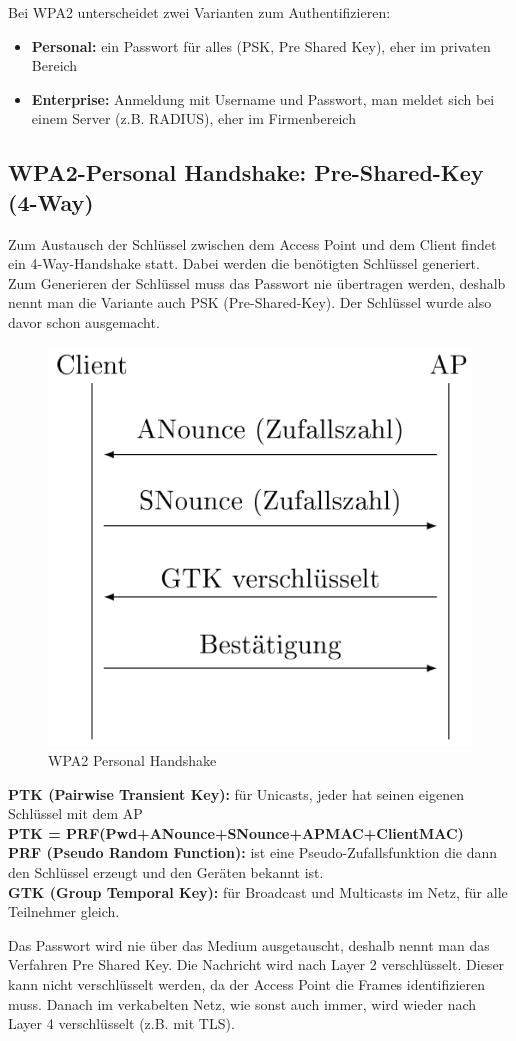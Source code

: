 Bei WPA2 unterscheidet zwei Varianten zum Authentifizieren:
\begin{itemize}
	\item \textbf{Personal:} ein Passwort für alles (PSK, Pre Shared Key), eher im privaten Bereich
	\item \textbf{Enterprise:} Anmeldung mit Username und Passwort, man meldet sich bei einem Server (z.B. RADIUS), eher im Firmenbereich
\end{itemize}

\subsection*{WPA2-Personal Handshake: Pre-Shared-Key (4-Way)}
Zum Austausch der Schlüssel zwischen dem Access Point und dem Client findet ein 4-Way-Handshake statt. Dabei werden die benötigten Schlüssel generiert. Zum Generieren der Schlüssel muss das Passwort nie übertragen werden, deshalb nennt man die Variante auch PSK (Pre-Shared-Key). Der Schlüssel wurde also davor schon ausgemacht.

\begin{figure}[H]
	\centering
	\includegraphics[width=0.8\linewidth]{figures/wpa2_personal_handshake.png}
	\caption{WPA2 Personal Handshake}
\end{figure}
\textbf{PTK (Pairwise Transient Key):} für Unicasts, jeder hat seinen eigenen Schlüssel mit dem AP \\
\textbf{PTK = PRF(Pwd+ANounce+SNounce+APMAC+ClientMAC)} \\
\textbf{PRF (Pseudo Random Function):} ist eine Pseudo-Zufallsfunktion die dann den Schlüssel erzeugt und den Geräten bekannt ist. \\
\textbf{GTK (Group Temporal Key):} für Broadcast und Multicasts im Netz, für alle Teilnehmer gleich.

Das Passwort wird nie über das Medium ausgetauscht, deshalb nennt man das Verfahren Pre Shared Key. Die Nachricht wird nach Layer 2 verschlüsselt. Dieser kann nicht verschlüsselt werden, da der Access Point die Frames identifizieren muss. Danach im verkabelten Netz, wie sonst auch immer, wird wieder nach Layer 4 verschlüsselt (z.B. mit TLS).